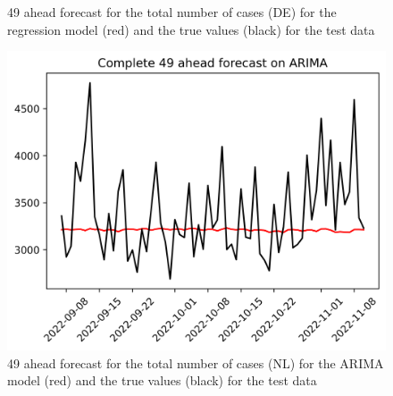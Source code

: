 \begin{figure}
\begin{minipage}{.32\textwidth}
  \caption{49 ahead forecast for the total number of cases (DE) for the regression model (red) and the true values (black) for the test data}
  \label{fig:tot_cases_fc_49_RM_DE}
\end{minipage}
\begin{minipage}{.32\textwidth}
  \centering
  \includegraphics[width=\linewidth]{pics/49_ah/Complete_49_ahead_ARIMA.png}
  \caption{49 ahead forecast for the total number of cases (NL) for the ARIMA model (red) and the true values (black) for the test data}
  \label{fig:tot_cases_fc_49_ARIMA}
\end{minipage}

\end{figure}
